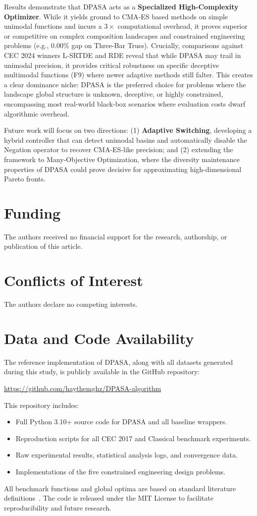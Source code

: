 \documentclass[11pt]{article}
\begin{document}
Results demonstrate that DPASA acts as a \textbf{Specialized High-Complexity Optimizer}. While it yields ground to CMA-ES based methods on simple unimodal functions and incurs a $3\times$ computational overhead, it proves superior or competitive on complex composition landscapes and constrained engineering problems (e.g., 0.00\% gap on Three-Bar Truss). Crucially, comparisons against CEC 2024 winners L-SRTDE and RDE reveal that while DPASA may trail in unimodal precision, it provides critical robustness on specific deceptive multimodal functions (F9) where newer adaptive methods still falter. This creates a clear dominance niche: DPASA is the preferred choice for problems where the landscape global structure is unknown, deceptive, or highly constrained, encompassing most real-world black-box scenarios where evaluation costs dwarf algorithmic overhead.

Future work will focus on two directions: (1) \textbf{Adaptive Switching}, developing a hybrid controller that can detect unimodal basins and automatically disable the Negation operator to recover CMA-ES-like precision; and (2) extending the framework to Many-Objective Optimization, where the diversity maintenance properties of DPASA could prove decisive for approximating high-dimensional Pareto fronts.

\section*{Funding}
The authors received no financial support for the research, authorship, or publication of this article.

\section*{Conflicts of Interest}
The authors declare no competing interests.

\section*{Data and Code Availability}
The reference implementation of DPASA, along with all datasets generated during this study, is publicly available in the GitHub repository:
\begin{center}
\url{https://github.com/haythemghz/DPASA-algorithm}
\end{center}
This repository includes:
\begin{itemize}
    \item Full Python 3.10+ source code for DPASA and all baseline wrappers.
    \item Reproduction scripts for all CEC 2017 and Classical benchmark experiments.
    \item Raw experimental results, statistical analysis logs, and convergence data.
    \item Implementations of the five constrained engineering design problems.
\end{itemize}
All benchmark functions and global optima are based on standard literature definitions~\cite{liang2013problem,hansen2009real}. The code is released under the MIT License to facilitate reproducibility and future research.


\end{document}
